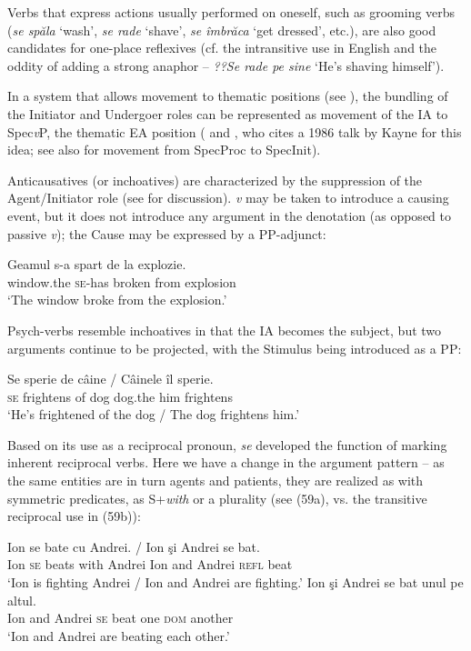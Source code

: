 \documentclass[output=paper]{langsci/langscibook}
\begin{document}
Verbs that express actions usually performed on oneself, such as grooming verbs (\textit{se spăla} ‘wash’, \textit{se rade} ‘shave’, \textit{se îmbrăca} ‘get dressed’, etc.), are also good candidates for one-place reflexives (cf. the intransitive use in English and the oddity of adding a strong anaphor – \textit{??Se rade pe sine} ‘He’s shaving himself’).

In a system that allows movement to thematic positions (see \citealt{Hornstein1999,Ramchand2008}), the bundling of the Initiator and Undergoer roles can be represented as movement of the IA to Spec\textit{v}P, the thematic EA position (\citealt{Alboiu2004} and \citealt{Medová2009}, who cites a 1986 talk by Kayne for this idea; see also \citealt{Ramchand2008} for movement from SpecProc to SpecInit).

Anticausatives (or inchoatives) are characterized by the suppression of the Agent\slash Initiator role (see \citealt{Schäfer2008} for discussion). \textit{v} may be taken to introduce a causing event, but it does not introduce any argument in the denotation (as opposed to passive \textit{v}); the Cause may be expressed by a PP-adjunct: 

\ea%
    \label{ex:giurgea:57}
    \gll Geamul        s-a      spart    {de la}  explozie.\\
         window.the \textsc{se-}has broken from explosion\\
    \glt ‘The window broke from the explosion.’
    \z

Psych-verbs resemble inchoatives in that the IA becomes the subject, but two arguments continue to be projected, with the Stimulus being introduced as a PP:

\ea%
    \label{ex:giurgea:58}
    \gll Se sperie     de câine / Câinele îl    sperie.\\
         \textsc{se} frightens of dog {}     dog.the him frightens\\
    \glt ‘He’s frightened of the dog / The dog frightens him.’
    \z



Based on its use as a reciprocal pronoun, \textit{se} developed the function of marking inherent reciprocal verbs. Here we have a change in the argument pattern – as the same entities are in turn agents and patients, they are realized as with symmetric predicates, as S+\textit{with} or a plurality (see (59a), vs. the transitive reciprocal use in (59b)):

\ea%
    \label{ex:giurgea:59}
    \ea
    \gll Ion se  bate   cu   Andrei.   /   Ion şi     Andrei se     bat.\\
          Ion \textsc{se} beats with Andrei   {}     Ion and Andrei \textsc{refl} beat\\
    \glt ‘Ion is fighting Andrei / Ion and Andrei are fighting.’
    \ex
    \gll Ion şi     Andrei se bat   unul pe     altul.\\
          Ion and Andrei  \textsc{se} beat one  \textsc{dom} another\\
    \glt ‘Ion and Andrei are beating each other.’
    \z
\z
\end{document}
